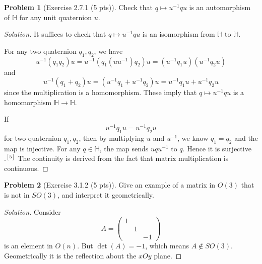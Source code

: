 \documentclass{article}
\theoremstyle{definition}
\newtheorem{problem}{Problem}
\theoremstyle{plain}
\begin{document}
\begin{problem}[Exercise 2.7.1 (5 pts)]Check that $q\mapsto u^{-1}qu$ is an automorphism of $\mathbb{H}$ for any unit quaternion $u$.
\end{problem}
\begin{adjustwidth}{0.7cm}{}
\color{blue}
\begin{proof}[Solution]It suffices to check that $q\mapsto u^{-1}qu$ is an isomorphism from $\mathbb{H}$ to $\mathbb{H}$.\par
For any two quaternion $q_1,q_2$, we have
\begin{displaymath}
u^{-1}(q_1q_2)u=u^{-1}(q_1(uu^{-1})q_2)u=(u^{-1}q_1u)(u^{-1}q_2u)
\end{displaymath}
and
\begin{displaymath}
u^{-1}(q_1+q_2)u=(u^{-1}q_1+u^{-1}q_2)u=u^{-1}q_1u+u^{-1}q_2u
\end{displaymath}
since the multiplication is a homomorphism. These imply that $q\mapsto u^{-1}qu$ is a homomorphism $\mathbb{H}\to\mathbb{H}$.\par
If
\begin{displaymath}
u^{-1}q_1u=u^{-1}q_2u
\end{displaymath}
for two quaternion $q_1,q_2$, then by multiplying $u$ and $u^{-1}$, we know $q_1=q_2$ and the map is injective. For any $q\in\mathbb{H}$, the map sends $uqu^{-1}$ to $q$. Hence it is surjective$.^{[5]}$
The continuity is derived from the fact that matrix multiplication is continuous.
\color{black}
\end{proof}
\end{adjustwidth}

\begin{problem}[Exercise 3.1.2 (5 pts)]Give an example of a matrix in $O(3)$ that is not in $SO(3)$, and interpret it geometrically.
\end{problem}
\begin{adjustwidth}{0.7cm}{}
\color{blue}
\begin{proof}[Solution]Consider
\begin{displaymath}
A=\begin{pmatrix}
1&&\\ &1&\\ &&-1
\end{pmatrix}
\end{displaymath}
is an element in $O(n)$. But $\det(A)=-1$, which means $A\notin SO(3)$. Geometrically it is the reflection about the $xOy$ plane.
\color{black}
\end{proof}
\end{adjustwidth}
\end{document}
